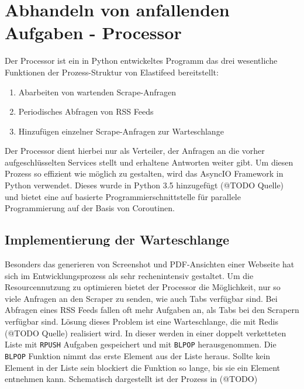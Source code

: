 \section{Abhandeln von anfallenden Aufgaben - Processor}

Der Processor ist ein in Python entwickeltes Programm das drei wesentliche Funktionen der Prozess-Struktur von Elastifeed bereitstellt:
\begin{enumerate}
        \item Abarbeiten von wartenden Scrape-Anfragen
        \item Periodisches Abfragen von RSS Feeds
        \item Hinzufügen einzelner Scrape-Anfragen zur Warteschlange
\end{enumerate}
Der Processor dient hierbei nur als Verteiler, der Anfragen an die vorher aufgeschlüsselten Services stellt und erhaltene Antworten weiter gibt.
Um diesen Prozess so effizient wie möglich zu gestalten, wird das AsyncIO Framework in Python verwendet.
Dieses wurde in Python 3.5 hinzugefügt (@TODO Quelle) und bietet eine auf  basierte Programmierschnittstelle für parallele Programmierung auf der Basis von Coroutinen.

\subsection{Implementierung der Warteschlange}
Besonders das generieren von Screenshot und PDF-Ansichten einer Webseite hat sich im Entwicklungsprozess als sehr rechenintensiv gestaltet.
Um die Resourcennutzung zu optimieren bietet der Processor die Möglichkeit, nur so viele Anfragen an den Scraper zu senden, wie auch Tabs verfügbar sind.
Bei Abfragen eines RSS Feeds fallen oft mehr Aufgaben an, als Tabs bei den Scrapern verfügbar sind.
Lösung dieses Problem ist eine Warteschlange, die mit Redis (@TODO Quelle) realisiert wird.
In dieser werden in einer doppelt verketteten Liste mit \texttt{RPUSH} Aufgaben gespeichert und mit \texttt{BLPOP} herausgenommen.
Die \texttt{BLPOP} Funktion nimmt das erste Element aus der Liste heraus.
Sollte kein Element in der Liste sein blockiert die Funktion so lange, bis sie ein Element entnehmen kann.
Schematisch dargestellt ist der Prozess in (@TODO)

